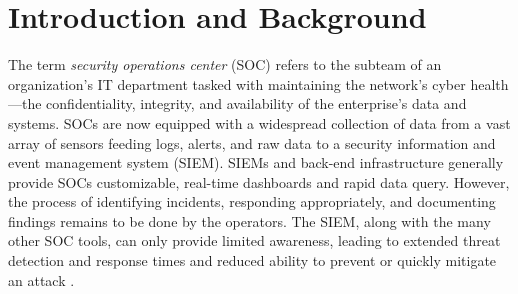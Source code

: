\section{Introduction and Background}
\vspace{-4mm}
\label{sec:intro} 
The term \textit{security operations center} (SOC) refers to the subteam of an organization's IT department tasked with maintaining the network's cyber health---the confidentiality, integrity, and availability of the enterprise's data and systems.
SOCs are now equipped with a widespread collection of data from a vast array of sensors feeding logs, alerts, and raw data to a security information and event management system (SIEM). 
SIEMs and back-end infrastructure generally provide SOCs customizable, real-time dashboards and rapid data query. 
However, the process of identifying incidents, responding appropriately, and documenting findings remains to be done by the operators. The SIEM, along with the many other SOC tools, can only provide limited awareness, leading to extended threat detection and response times and reduced ability to prevent or quickly mitigate an attack \citep{Network, islam_babar_nepal_2019}. 

